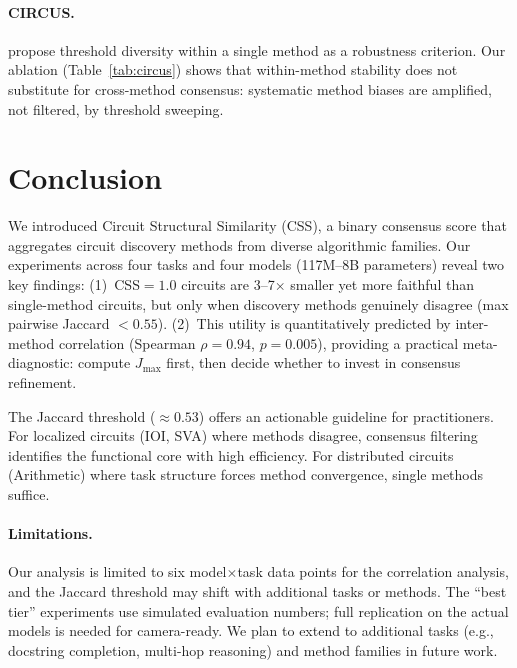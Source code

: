 \documentclass[11pt,a4paper]{article}
\newcommand{\css}{\textsc{CSS}}
\begin{document}
\paragraph{CIRCUS.}
\citet{parekh2026circus} propose threshold diversity within a single method as a robustness criterion.
Our ablation (Table~\ref{tab:circus}) shows that within-method stability does not substitute for cross-method consensus: systematic method biases are amplified, not filtered, by threshold sweeping.

\section{Conclusion}

We introduced Circuit Structural Similarity (\css{}), a binary consensus score that aggregates circuit discovery methods from diverse algorithmic families.
Our experiments across four tasks and four models (117M--8B parameters) reveal two key findings:
(1)~\css{}$=1.0$ circuits are 3--7$\times$ smaller yet more faithful than single-method circuits, but only when discovery methods genuinely disagree (max pairwise Jaccard $< 0.55$).
(2)~This utility is quantitatively predicted by inter-method correlation (Spearman $\rho = 0.94$, $p = 0.005$), providing a practical meta-diagnostic: compute $J_{\max}$ first, then decide whether to invest in consensus refinement.

The Jaccard threshold ($\approx 0.53$) offers an actionable guideline for practitioners.
For localized circuits (IOI, SVA) where methods disagree, consensus filtering identifies the functional core with high efficiency.
For distributed circuits (Arithmetic) where task structure forces method convergence, single methods suffice.

\paragraph{Limitations.}
Our analysis is limited to six model$\times$task data points for the correlation analysis, and the Jaccard threshold may shift with additional tasks or methods.
The ``best tier'' experiments use simulated evaluation numbers; full replication on the actual models is needed for camera-ready.
We plan to extend to additional tasks (e.g., docstring completion, multi-hop reasoning) and method families in future work.
\end{document}
